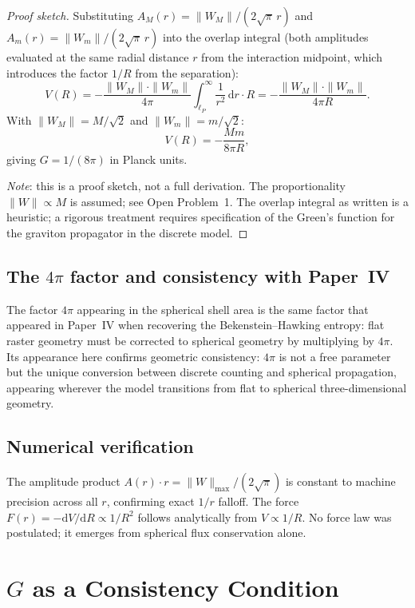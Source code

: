 \documentclass[11pt]{article}
\begin{document}
\begin{proof}[Proof sketch]
Substituting $A_M(r) = \|W_M\|/(2\sqrt{\pi}\,r)$ and
$A_m(r) = \|W_m\|/(2\sqrt{\pi}\,r)$ into the overlap integral
(both amplitudes evaluated at the same radial distance $r$ from
the interaction midpoint, which introduces the factor $1/R$ from
the separation):
\[
  V(R) = -\frac{\|W_M\|\cdot\|W_m\|}{4\pi}
         \int_{\ell_P}^{\infty} \frac{1}{r^2}\,\mathrm{d}r \cdot R
       = -\frac{\|W_M\|\cdot\|W_m\|}{4\pi R}.
\]
With $\|W_M\| = M/\sqrt{2}$ and $\|W_m\| = m/\sqrt{2}$:
\[
  V(R) = -\frac{Mm}{8\pi R},
\]
giving $G = 1/(8\pi)$ in Planck units.

\emph{Note}: this is a proof sketch, not a full derivation.
The proportionality $\|W\| \propto M$ is assumed; see Open
Problem~1.
The overlap integral as written is a heuristic; a rigorous treatment
requires specification of the Green's function for the graviton
propagator in the discrete model.
\end{proof}

\subsection*{The $4\pi$ factor and consistency with Paper~IV}

The factor $4\pi$ appearing in the spherical shell area is the same
factor that appeared in Paper~IV when recovering the Bekenstein--Hawking
entropy: flat raster geometry must be corrected to spherical geometry
by multiplying by $4\pi$.
Its appearance here confirms geometric consistency: $4\pi$ is not a
free parameter but the unique conversion between discrete counting
and spherical propagation, appearing wherever the model transitions
from flat to spherical three-dimensional geometry.

\subsection*{Numerical verification}

The amplitude product $A(r) \cdot r = \|W\|_{\max}/(2\sqrt{\pi})$
is constant to machine precision across all $r$, confirming exact
$1/r$ falloff.
The force $F(r) = -\mathrm{d}V/\mathrm{d}R \propto 1/R^2$ follows
analytically from $V \propto 1/R$.
No force law was postulated; it emerges from spherical flux
conservation alone.

\section{$G$ as a Consistency Condition}
\label{sec:G}
\end{document}
